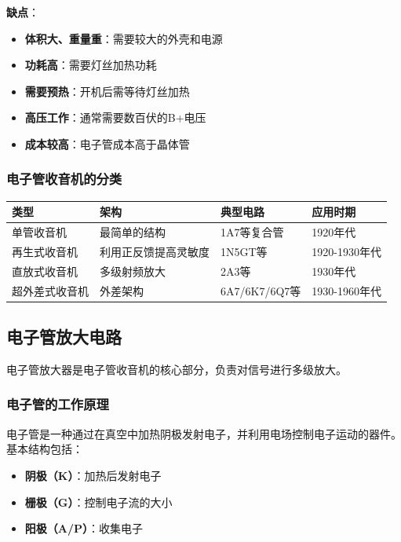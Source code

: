 \textbf{缺点}：
\begin{itemize}
    \item \textbf{体积大、重量重}：需要较大的外壳和电源
    \item \textbf{功耗高}：需要灯丝加热功耗
    \item \textbf{需要预热}：开机后需等待灯丝加热
    \item \textbf{高压工作}：通常需要数百伏的B+电压
    \item \textbf{成本较高}：电子管成本高于晶体管
\end{itemize}

\subsubsection{电子管收音机的分类}
\label{sec:tube_radio_classification}

\begin{center}
\begin{tabular}{|p{3cm}|p{4cm}|p{4cm}|p{4cm}|}
\hline
\textbf{类型} & \textbf{架构} & \textbf{典型电路} & \textbf{应用时期} \\
\hline
单管收音机 & 最简单的结构 & 1A7等复合管 & 1920年代 \\
再生式收音机 & 利用正反馈提高灵敏度 & 1N5GT等 & 1920-1930年代 \\
直放式收音机 & 多级射频放大 & 2A3等 & 1930年代 \\
超外差式收音机 & 外差架构 & 6A7/6K7/6Q7等 & 1930-1960年代 \\
\hline
\end{tabular}
\end{center}

\subsection{电子管放大电路}
\label{sec:tube_amplifier_circuit}

电子管放大器是电子管收音机的核心部分，负责对信号进行多级放大。

\subsubsection{电子管的工作原理}
\label{sec:tube_working_principle}

电子管是一种通过在真空中加热阴极发射电子，并利用电场控制电子运动的器件。基本结构包括：
\begin{itemize}
    \item \textbf{阴极（K）}：加热后发射电子
    \item \textbf{栅极（G）}：控制电子流的大小
    \item \textbf{阳极（A/P）}：收集电子
\end{itemize}

